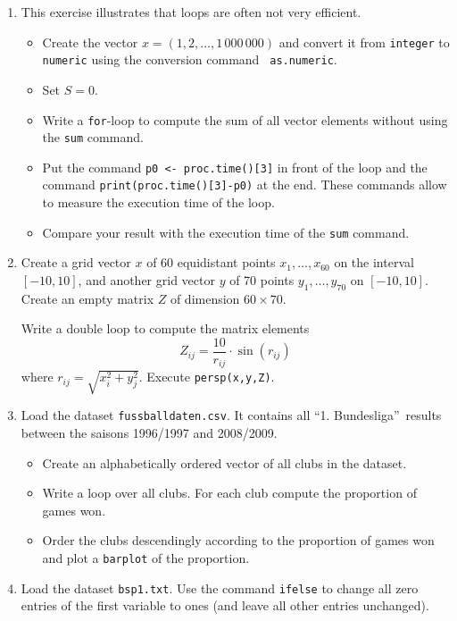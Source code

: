 \documentclass{article}
\begin{document}
\begin{enumerate}
\item This exercise illustrates that loops are often not very efficient.

\begin{itemize}
\item Create the vector $x=(1,2,\ldots ,1\,000\,000)$ and convert it from 
\texttt{integer} to \texttt{numeric} using the conversion command \texttt{%
as.numeric}.

\item Set $S=0$.

\item Write a \texttt{for}-loop to compute the sum of all vector elements
without using the \texttt{sum} command.

\item Put the command \texttt{p0 <- proc.time()[3]} in front of
the loop and the command \texttt{print(proc.time()[3]-p0)} at the end. These
commands allow to measure the execution time of the loop.

\item Compare your result with the execution time of the \texttt{sum}
command.
\end{itemize}

\item Create a grid vector $x$ of 60 equidistant points $x_{1},\ldots
,x_{60} $ on the interval $[-10,10]$, and another grid vector $y$ of 70
points $y_{1},\ldots ,y_{70}$ on $[-10,10]$. Create an empty matrix $Z$ of
dimension $60\times 70$.

Write a double loop to compute the matrix elements%
\begin{equation*}
Z_{ij}=\frac{10}{r_{ij}}\cdot \sin (r_{ij})
\end{equation*}%
where $r_{ij}=\sqrt{x_{i}^{2}+y_{j}^{2}}$. Execute \texttt{persp(x,y,Z)}.

\item Load the dataset \texttt{fussballdaten.csv}. It contains all
\textquotedblleft 1. Bundesliga\textquotedblright\ results between the
saisons 1996/1997 and 2008/2009.

\begin{itemize}
\item Create an alphabetically ordered vector of all clubs in the dataset.

\item Write a loop over all clubs. For each club compute the proportion of
games won.

\item Order the clubs descendingly according to the proportion of games won
and plot a \texttt{barplot} of the proportion.
\end{itemize}

\item Load the dataset \texttt{bsp1.txt}. Use the command \texttt{ifelse} to
change all zero entries of the first variable to ones (and leave all other
entries unchanged).
\end{enumerate}
\newpage
\end{document}

